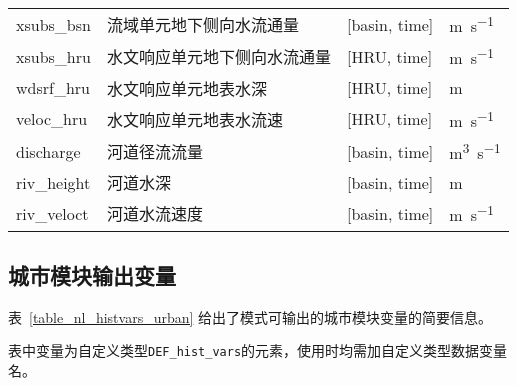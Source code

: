 {\begin{longtable}[htbp]{lp{}p{}l}
xsubs\_bsn   & 流域单元地下侧向水流通量 & {[}basin, time{]} & \unit{m.s^{-1}} \\
xsubs\_hru   & 水文响应单元地下侧向水流通量 & {[}HRU, time{]} & \unit{m.s^{-1}} \\
wdsrf\_hru   & 水文响应单元地表水深 & {[}HRU, time{]} & m \\
veloc\_hru   & 水文响应单元地表水流速 & {[}HRU, time{]} & \unit{m.s^{-1}} \\
discharge    & 河道径流流量 & {[}basin, time{]} & \unit{m^3.s^{-1}} \\
riv\_height  & 河道水深 & {[}basin, time{]} & \unit{m} \\
riv\_veloct  & 河道水流速度 & {[}basin, time{]} & \unit{m.s^{-1}} \\

\end{longtable}}

\subsection{城市模块输出变量}

表~\ref{table_nl_histvars_urban} 给出了模式可输出的城市模块变量的简要信息。\par
表中变量为自定义类型\texttt{DEF\_hist\_vars}的元素，使用时均需加自定义类型数据变量名。

